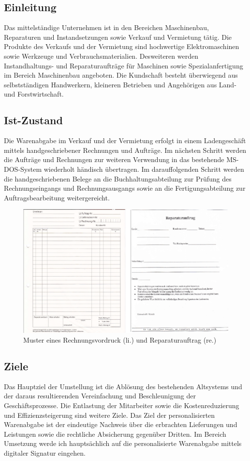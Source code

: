 \subsection{Einleitung}
Das mittelständige Unternehmen ist in den Bereichen Maschinenbau, Reparaturen und Instandsetzungen sowie Verkauf und Vermietung tätig. Die Produkte des Verkaufs und der Vermietung sind hochwertige Elektromaschinen sowie Werkzeuge und Verbrauchsmaterialien. Desweiteren werden Instandhaltungs- und Reparaturaufträge für Maschinen sowie Spezialanfertigung im Bereich Maschinenbau angeboten. Die Kundschaft besteht überwiegend aus selbstständigen Handwerkern, kleineren Betrieben und Angehörigen aus Land- und Forstwirtschaft. \cite{einleitung1}
\subsection{Ist-Zustand}
Die Warenabgabe im Verkauf und der Vermietung erfolgt in einem Ladengeschäft mittels handgeschriebener Rechnungen und Aufträge. Im nächsten Schritt werden die Aufträge und Rechnungen zur weiteren Verwendung in das bestehende MS-DOS-System wiederholt händisch übertragen. Im darauffolgenden Schritt werden die handgeschriebenen Belege an die Buchhaltungsabteilung zur Prüfung des Rechnungseingangs und Rechnungsausgangs sowie an die Fertigungsabteilung zur Auftragsbearbeitung weitergereicht. \cite{einleitung1}
\begin{figure}[!ht]
    \centering
    \includegraphics{rechnungReparaturAlt2.png}
    \caption[Muster Rechnungsvordruck und Reparaturauftrag]{\small{Muster eines Rechnungsvordruck (li.) und Reparaturauftrag (re.) \cite{einleitung1}}}
    \label{fig:4}
\end{figure}
\subsection{Ziele}
Das Hauptziel der Umstellung ist die Ablösung des bestehenden Altsystems und der daraus resultierenden Vereinfachung und Beschleunigung der Geschäftsprozesse. Die Entlastung der Mitarbeiter sowie die Kostenreduzierung und Effizienzsteigerung sind weitere Ziele. Das Ziel der personalisierten Warenabgabe ist der eindeutige Nachweis über die erbrachten Lieferungen und Leistungen sowie die rechtliche Absicherung gegenüber Dritten. Im Bereich Umsetzung werde ich hauptsächlich auf die personalisierte Warenabgabe mittels digitaler Signatur eingehen. \cite{einleitung1}